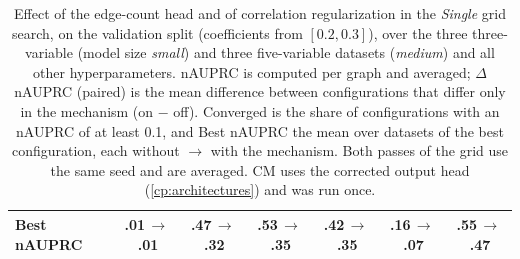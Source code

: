 \begin{table}[ht]
\begin{tabular}{lccccc|c}
        \quad Best nAUPRC & .01\,$\to$\,.01 & .47\,$\to$\,.32 & .53\,$\to$\,.35 & .42\,$\to$\,.35 & .16\,$\to$\,.07 & .55\,$\to$\,.47 \\
    \bottomrule
    \end{tabular}
    \caption{Effect of the edge-count head and of correlation regularization in the \emph{Single} grid search, on the validation split (coefficients from $[0.2,0.3]$), over the three three-variable (model size \emph{small}) and three five-variable datasets (\emph{medium}) and all other hyperparameters. nAUPRC is computed per graph and averaged; $\Delta$nAUPRC (paired) is the mean difference between configurations that differ only in the mechanism (on $-$ off). Converged is the share of configurations with an nAUPRC of at least 0.1, and Best nAUPRC the mean over datasets of the best configuration, each without $\to$ with the mechanism. Both passes of the grid use the same seed and are averaged. CM uses the corrected output head (\cref{cp:architectures}) and was run once.}
    \label{tab:cp:helpers}
\end{table}
